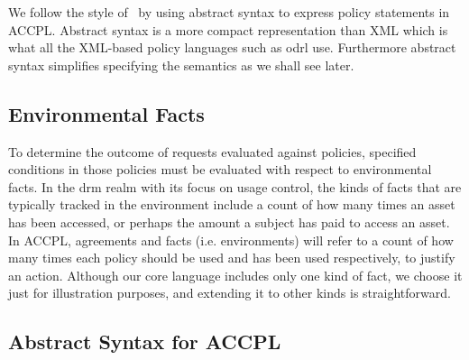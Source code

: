 \documentclass[conference]{IEEEtran}
\begin{document}
We follow the style of~\cite{pucella2006} by using abstract syntax to express policy statements in \ac{ACCPL}. Abstract syntax is a more compact representation than XML which is what all the XML-based policy languages such as \ac{odrl} use. Furthermore abstract syntax simplifies specifying the semantics as we shall see later.


\subsection{Environmental Facts}\label{sec:odrl0}
To determine the outcome of requests evaluated against policies,
specified conditions in those policies must be evaluated with respect
to environmental facts. In the \ac{drm} realm with its focus on usage
control, the kinds of facts that are typically tracked in the
environment include a count of how many times an asset has been
accessed, or perhaps the amount a subject has paid to access an asset. In \ac{ACCPL}, agreements and facts (i.e. environments) will
refer to a count of how many times each policy should be used and has
been used respectively, to justify an action.
Although our core language includes only one kind of fact, we choose
it just for illustration purposes, and extending it to other kinds is
straightforward.

\subsection{Abstract Syntax for ACCPL} \label{sec:productionast}

\newcommand*{\Comment}[1]{\hfill\makebox[7.0cm][l]{#1}}%
\newcommand*{\CommentPP}[1]{\hfill\makebox[7.0cm][l]{#1}}%
\end{document}
